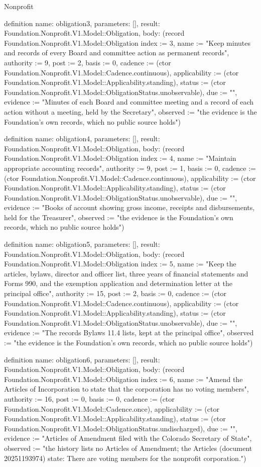 \begin{lexlean}{Nonprofit}
\begin{semanticmodule}
definition{
  name: obligation3,
  parameters: [],
  result: Foundation.Nonprofit.V1.Model::Obligation,
  body: (record Foundation.Nonprofit.V1.Model::Obligation {index := 3, name := "Keep minutes and records of every Board and committee action as permanent records", authority := 9, post := 2, basis := 0, cadence := (ctor Foundation.Nonprofit.V1.Model::Cadence.continuous), applicability := (ctor Foundation.Nonprofit.V1.Model::Applicability.standing), status := (ctor Foundation.Nonprofit.V1.Model::ObligationStatus.unobservable), due := "", evidence := "Minutes of each Board and committee meeting and a record of each action without a meeting, held by the Secretary", observed := "the evidence is the Foundation’s own records, which no public source holds"})
}

definition{
  name: obligation4,
  parameters: [],
  result: Foundation.Nonprofit.V1.Model::Obligation,
  body: (record Foundation.Nonprofit.V1.Model::Obligation {index := 4, name := "Maintain appropriate accounting records", authority := 9, post := 1, basis := 0, cadence := (ctor Foundation.Nonprofit.V1.Model::Cadence.continuous), applicability := (ctor Foundation.Nonprofit.V1.Model::Applicability.standing), status := (ctor Foundation.Nonprofit.V1.Model::ObligationStatus.unobservable), due := "", evidence := "Books of account showing gross income, receipts and disbursements, held for the Treasurer", observed := "the evidence is the Foundation’s own records, which no public source holds"})
}

definition{
  name: obligation5,
  parameters: [],
  result: Foundation.Nonprofit.V1.Model::Obligation,
  body: (record Foundation.Nonprofit.V1.Model::Obligation {index := 5, name := "Keep the articles, bylaws, director and officer list, three years of financial statements and Forms 990, and the exemption application and determination letter at the principal office", authority := 15, post := 2, basis := 0, cadence := (ctor Foundation.Nonprofit.V1.Model::Cadence.continuous), applicability := (ctor Foundation.Nonprofit.V1.Model::Applicability.standing), status := (ctor Foundation.Nonprofit.V1.Model::ObligationStatus.unobservable), due := "", evidence := "The records Bylaws 11.4 lists, kept at the principal office", observed := "the evidence is the Foundation’s own records, which no public source holds"})
}

definition{
  name: obligation6,
  parameters: [],
  result: Foundation.Nonprofit.V1.Model::Obligation,
  body: (record Foundation.Nonprofit.V1.Model::Obligation {index := 6, name := "Amend the Articles of Incorporation to state that the corporation has no voting members", authority := 16, post := 0, basis := 0, cadence := (ctor Foundation.Nonprofit.V1.Model::Cadence.once), applicability := (ctor Foundation.Nonprofit.V1.Model::Applicability.standing), status := (ctor Foundation.Nonprofit.V1.Model::ObligationStatus.undischarged), due := "", evidence := "Articles of Amendment filed with the Colorado Secretary of State", observed := "the history lists no Articles of Amendment; the Articles (document 20251193974) state: There are voting members for the nonprofit corporation."})
}


\end{semanticmodule}
\end{lexlean}
